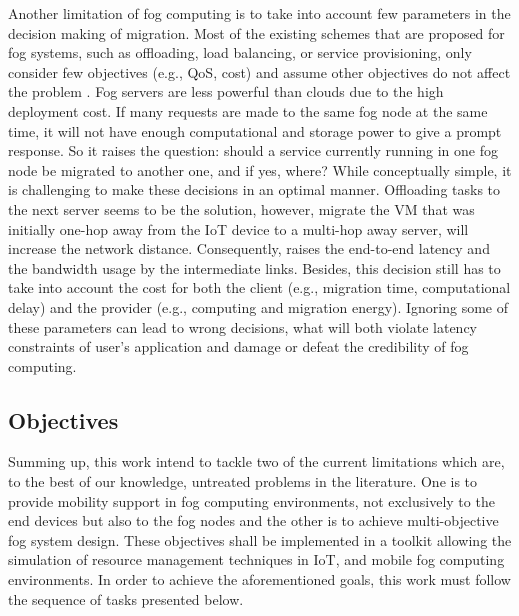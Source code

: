\noindent\tab Another limitation of fog computing is to take into account few parameters in the decision making of migration. Most of the existing schemes that are proposed for fog systems, such as offloading, load balancing, or service provisioning, only consider few objectives (e.g., QoS, cost) and assume other objectives do not affect the problem \cite{yousefpour2018all}. Fog servers are less powerful than clouds due to the high deployment cost. If many requests are made to the same fog node at the same time, it will not have enough computational and storage power to give a prompt response. So it raises the question: should a service currently running in one fog node be migrated to another one, and if yes, where? While conceptually simple, it is challenging to make these decisions in an optimal manner. Offloading tasks to the next server seems to be the solution, however, migrate the VM that was initially one-hop away from the IoT device to a multi-hop away server, will increase the network distance. Consequently, raises the end-to-end latency and the bandwidth usage by the intermediate links. Besides, this decision still has to take into account the cost for both the client (e.g., migration time, computational delay) and the provider (e.g., computing and migration energy). Ignoring some of these parameters can lead to wrong decisions, what will both violate latency constraints of user's application and damage or defeat the credibility of fog computing.
\subsection{Objectives}\label{subsec:Objectives}
\noindent\tab Summing up, this work intend to tackle two of the current limitations which are, to the best of our knowledge, untreated problems in the literature. One is to provide mobility support in fog computing environments, not exclusively to the end devices but also to the fog nodes and the other is to achieve multi-objective fog system design. These objectives shall be implemented in a toolkit allowing the simulation of resource management techniques in IoT, and mobile fog computing environments. In order to achieve the aforementioned goals, this work must follow the sequence of tasks presented below.

